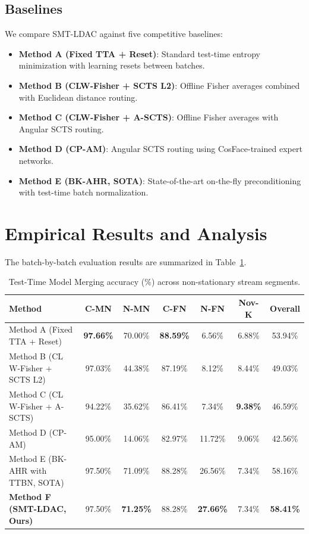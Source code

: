 \documentclass{article}
\theoremstyle{plain}
\theoremstyle{definition}
\theoremstyle{remark}
\begin{document}
\subsection{Baselines}
We compare SMT-LDAC against five competitive baselines:
\begin{itemize}
    \item \textbf{Method A (Fixed TTA + Reset)}: Standard test-time entropy minimization with learning resets between batches.
    \item \textbf{Method B (CLW-Fisher + SCTS L2)}: Offline Fisher averages combined with Euclidean distance routing.
    \item \textbf{Method C (CLW-Fisher + A-SCTS)}: Offline Fisher averages with Angular SCTS routing.
    \item \textbf{Method D (CP-AM)}: Angular SCTS routing using CosFace-trained expert networks.
    \item \textbf{Method E (BK-AHR, SOTA)}: State-of-the-art on-the-fly preconditioning with test-time batch normalization.
\end{itemize}

\section{Empirical Results and Analysis}
\label{sec:results}
The batch-by-batch evaluation results are summarized in Table~\ref{tab:results}.

\begin{table}[t]
\caption{Test-Time Model Merging accuracy (\%) across non-stationary stream segments.}
\label{tab:results}
\vskip 0.15in
\begin{center}
\begin{small}
\begin{tabular}{lcccccc}
\toprule
\textbf{Method} & \textbf{C-MN} & \textbf{N-MN} & \textbf{C-FN} & \textbf{N-FN} & \textbf{Nov-K} & \textbf{Overall} \\
\midrule
Method A (Fixed TTA + Reset) & \textbf{97.66\%} & 70.00\% & \textbf{88.59\%} & 6.56\% & 6.88\% & 53.94\% \\
Method B (CL W-Fisher + SCTS L2) & 97.03\% & 44.38\% & 87.19\% & 8.12\% & 8.44\% & 49.03\% \\
Method C (CL W-Fisher + A-SCTS) & 94.22\% & 35.62\% & 86.41\% & 7.34\% & \textbf{9.38\%} & 46.59\% \\
Method D (CP-AM) & 95.00\% & 14.06\% & 82.97\% & 11.72\% & 9.06\% & 42.56\% \\
\midrule
Method E (BK-AHR with TTBN, SOTA) & 97.50\% & 71.09\% & 88.28\% & 26.56\% & 7.34\% & 58.16\% \\
\textbf{Method F (SMT-LDAC, Ours)} & 97.50\% & \textbf{71.25\%} & 88.28\% & \textbf{27.66\%} & 7.34\% & \textbf{58.41\%} \\
\bottomrule
\end{tabular}
\end{small}
\end{center}
\vskip -0.1in
\end{table}
\end{document}
